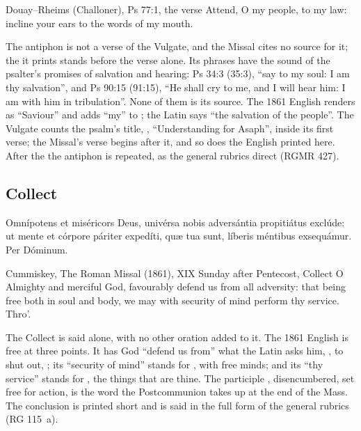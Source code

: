\begin{englishwitness}{Douay--Rheims (Challoner), Ps 77:1, the verse}
Attend, O my people, to my law: incline your ears to the words of my mouth.
\end{englishwitness}

\noindent The antiphon is not a verse of the Vulgate, and the Missal cites no
source for it; the  it prints stands before the verse alone.
Its phrases have the sound of the psalter's promises of salvation and hearing:
Ps 34:3 (35:3), ``say to my soul: I am thy salvation'', and Ps 90:15 (91:15),
``He shall cry to me, and I will hear him: I am with him in tribulation''.
None of them is its source. The 1861 English renders  as ``Saviour'' and adds ``my''
to ; the Latin says ``the salvation of the people''. The Vulgate
counts the psalm's title, , ``Understanding for
Asaph'', inside its first verse; the Missal's verse begins after it, and so
does the English printed here. After the  the antiphon is
repeated, as the general rubrics direct (RGMR 427).

\subsection{Collect}
\label{proper-collect}


\begin{latinproper}
Omnípotens et miséricors Deus, univérsa nobis adversántia propitiátus exclúde:
ut mente et córpore páriter expedíti, quæ tua sunt, líberis méntibus
exsequámur. Per Dóminum.
\end{latinproper}

\begin{englishwitness}{Cummiskey, The Roman Missal (1861), XIX Sunday after Pentecost, Collect}
O Almighty and merciful God, favourably defend us from all adversity: that
being free both in soul and body, we may with security of mind perform thy
service. Thro'.
\end{englishwitness}

\noindent The Collect is said alone, with no other oration added to it. The 1861 English is
free at three points. It has God ``defend us from'' what the Latin asks him,
, to shut out, ; its ``security of mind''
stands for , with free minds; and its ``thy service''
stands for , the things that are thine. The participle
, disencumbered, set free for action, is the word the
Postcommunion takes up at the end of the Mass. The conclusion is printed short
and is said in the full form of the general rubrics (RG 115~a).

